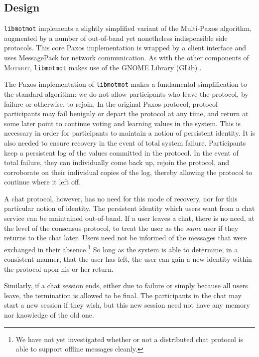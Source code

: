 \documentclass{sig-alternate}
\newcommand\Motmot{\textsc{Motmot}\xspace}
\newcommand\libmotmot{\texttt{libmotmot}\xspace}
\begin{document}
\subsection{Design}

\libmotmot implements a slightly simplified variant of the Multi-Paxos
algorithm, augmented by a number of out-of-band yet nonetheless indispensible
side protocols.  This core Paxos implementation is wrapped by a client
interface and uses MessagePack \cite{msgpack} for network communication.
As with the other components of \Motmot, \libmotmot makes use of the GNOME
Library (GLib) \cite{glib}.

The Paxos implementation of \libmotmot makes a fundamental simplification to
the standard algorithm: we do not allow participants who leave the protocol, by
failure or otherwise, to rejoin.  In the original Paxos protocol, protocol
participants may fail benignly or depart the protocol at any time, and return
at some later point to continue voting and learning values in the system.
This is necessary in order for participants to maintain a notion of persistent
identity.  It is also needed to ensure recovery in the event of total system
failure.  Participants keep a persistent log of the values committed in the
protocol.  In the event of total failure, they can individually come back up,
rejoin the protocol, and corroborate on their individual copies of the log,
thereby allowing the protocol to continue where it left off.

A chat protocol, however, has no need for this mode of recovery, nor for this
particular notion of identity.  The persistent identity which users want from
a chat service can be maintained out-of-band.  If a user leaves a chat, there
is no need, at the level of the consensus protocol, to treat the user as the
\emph{same} user if they returns to the chat later.  Users need not be informed
of the messages that were exchanged in their absence.\footnote{We have not yet
investigated whether or not a distributed chat protocol is able to support
offline messages cleanly.}  So long as the system is able to determine, in a
consistent manner, that the user has left, the user can gain a new identity
within the protocol upon his or her return.

Similarly, if a chat session ends, either due to failure or simply because all
users leave, the termination is allowed to be final.  The participants in the
chat may start a new session if they wish, but this new session need not have
any memory nor knowledge of the old one.
\end{document}
